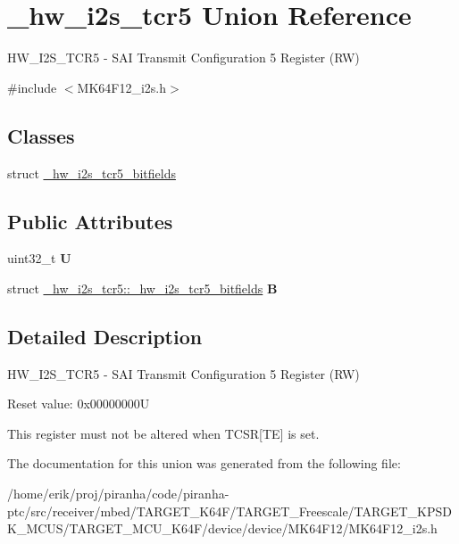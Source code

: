 \hypertarget{union__hw__i2s__tcr5}{}\section{\+\_\+hw\+\_\+i2s\+\_\+tcr5 Union Reference}
\label{union__hw__i2s__tcr5}


H\+W\+\_\+\+I2\+S\+\_\+\+T\+C\+R5 -\/ S\+AI Transmit Configuration 5 Register (RW)  




{\ttfamily \#include $<$M\+K64\+F12\+\_\+i2s.\+h$>$}

\subsection*{Classes}
\begin{DoxyCompactItemize}
\item 
struct \hyperlink{struct__hw__i2s__tcr5_1_1__hw__i2s__tcr5__bitfields}{\+\_\+hw\+\_\+i2s\+\_\+tcr5\+\_\+bitfields}
\end{DoxyCompactItemize}
\subsection*{Public Attributes}
\begin{DoxyCompactItemize}
\item 
uint32\+\_\+t {\bfseries U}\hypertarget{union__hw__i2s__tcr5_a83e5d5c4fe7e4300586c16689ab90e7b}{}\label{union__hw__i2s__tcr5_a83e5d5c4fe7e4300586c16689ab90e7b}

\item 
struct \hyperlink{struct__hw__i2s__tcr5_1_1__hw__i2s__tcr5__bitfields}{\+\_\+hw\+\_\+i2s\+\_\+tcr5\+::\+\_\+hw\+\_\+i2s\+\_\+tcr5\+\_\+bitfields} {\bfseries B}\hypertarget{union__hw__i2s__tcr5_afdb341977118a9ac90f45350c925f8d4}{}\label{union__hw__i2s__tcr5_afdb341977118a9ac90f45350c925f8d4}

\end{DoxyCompactItemize}


\subsection{Detailed Description}
H\+W\+\_\+\+I2\+S\+\_\+\+T\+C\+R5 -\/ S\+AI Transmit Configuration 5 Register (RW) 

Reset value\+: 0x00000000U

This register must not be altered when T\+C\+SR\mbox{[}TE\mbox{]} is set. 

The documentation for this union was generated from the following file\+:\begin{DoxyCompactItemize}
\item 
/home/erik/proj/piranha/code/piranha-\/ptc/src/receiver/mbed/\+T\+A\+R\+G\+E\+T\+\_\+\+K64\+F/\+T\+A\+R\+G\+E\+T\+\_\+\+Freescale/\+T\+A\+R\+G\+E\+T\+\_\+\+K\+P\+S\+D\+K\+\_\+\+M\+C\+U\+S/\+T\+A\+R\+G\+E\+T\+\_\+\+M\+C\+U\+\_\+\+K64\+F/device/device/\+M\+K64\+F12/M\+K64\+F12\+\_\+i2s.\+h\end{DoxyCompactItemize}
